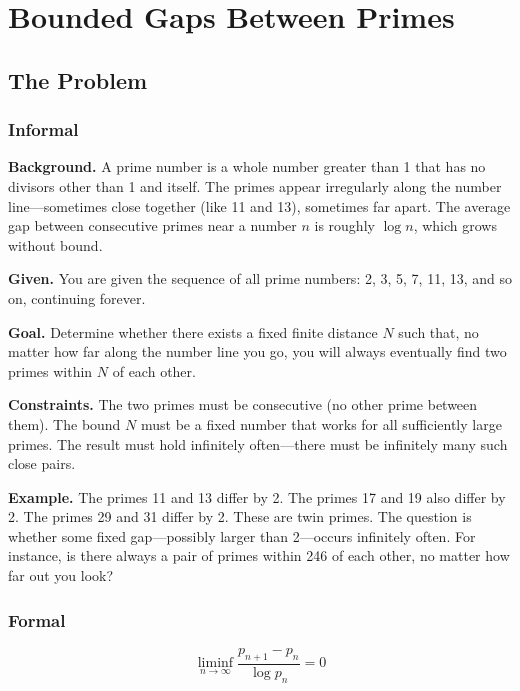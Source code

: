 \let\LocalMacro\relax

\chapter{Bounded Gaps Between Primes}

\section{The Problem}

\subsection{Informal}

\textbf{Background.} A prime number is a whole number greater than 1 that has no divisors other than 1 and itself. The primes appear irregularly along the number line---sometimes close together (like 11 and 13), sometimes far apart. The average gap between consecutive primes near a number $n$ is roughly $\log n$, which grows without bound.

\textbf{Given.} You are given the sequence of all prime numbers: 2, 3, 5, 7, 11, 13, and so on, continuing forever.

\textbf{Goal.} Determine whether there exists a fixed finite distance $N$ such that, no matter how far along the number line you go, you will always eventually find two primes within $N$ of each other.

\textbf{Constraints.} The two primes must be consecutive (no other prime between them). The bound $N$ must be a fixed number that works for all sufficiently large primes. The result must hold infinitely often---there must be infinitely many such close pairs.

\textbf{Example.} The primes 11 and 13 differ by 2. The primes 17 and 19 also differ by 2. The primes 29 and 31 differ by 2. These are twin primes. The question is whether some fixed gap---possibly larger than 2---occurs infinitely often. For instance, is there always a pair of primes within 246 of each other, no matter how far out you look?

\subsection{Formal}
\begin{equation}
\liminf_{n \to \infty} \frac{p_{n+1} - p_n}{\log p_n} = 0
\end{equation}

